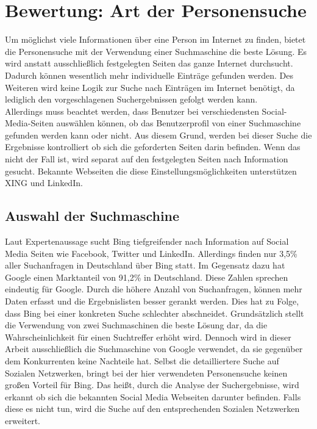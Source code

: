 \section{Bewertung: Art der Personensuche}
Um möglichst viele Informationen über eine Person im Internet zu finden, bietet die Personensuche mit der Verwendung einer Suchmaschine die beste Lösung. Es wird anstatt ausschließlich festgelegten Seiten das ganze Internet durchsucht. Dadurch können wesentlich mehr individuelle Einträge gefunden werden. Des Weiteren wird keine Logik zur Suche nach Einträgen im Internet benötigt, da lediglich den vorgeschlagenen Suchergebnissen gefolgt werden kann.\\
Allerdings muss beachtet werden, dass Benutzer bei verschiedensten Social-Media-Seiten auswählen können, ob das Benutzerprofil von einer Suchmaschine gefunden werden kann oder nicht. Aus diesem Grund, werden bei dieser Suche die Ergebnisse kontrolliert ob sich die geforderten Seiten darin befinden. Wenn das nicht der Fall ist, wird separat auf den festgelegten Seiten nach Information gesucht. Bekannte Webseiten die diese Einstellungsmöglichkeiten unterstützen XING und LinkedIn.\\
	\subsection{Auswahl der Suchmaschine}
	Laut Expertenaussage sucht Bing tiefgreifender nach Information auf Social Media Seiten wie Facebook, Twitter und LinkedIn. Allerdings finden nur 3,5\% aller Suchanfragen in Deutschland über Bing statt. Im Gegensatz dazu hat Google einen Marktanteil von 91,2\% in Deutschland. Diese Zahlen sprechen eindeutig für Google. Durch die höhere Anzahl von Suchanfragen, können mehr Daten erfasst und die Ergebnislisten besser gerankt werden. Dies hat zu Folge, dass Bing bei einer konkreten Suche schlechter abschneidet. \cite{Suchmaschinen}
	Grundsätzlich stellt die Verwendung von zwei Suchmaschinen die beste Lösung dar, da die Wahrscheinlichkeit für einen Suchtreffer erhöht wird. Dennoch wird in dieser Arbeit ausschließlich die Suchmaschine von Google verwendet, da sie gegenüber dem Konkurrenten keine Nachteile hat. Selbst die detailliertere Suche auf Sozialen Netzwerken, bringt bei der hier verwendeten Personensuche keinen großen Vorteil für Bing. Das heißt, durch die Analyse der Suchergebnisse, wird erkannt ob sich die bekannten Social Media Webseiten darunter befinden. Falls diese es nicht tun, wird die Suche auf den entsprechenden Sozialen Netzwerken erweitert.
	 	
